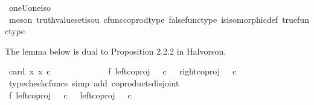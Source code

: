 \begin{isabellebody}
\isamarkupfalse%
%
\endisatagproof
{\isafoldproof}%
%
\isadelimproof
\isanewline
%
\endisadelimproof
\isanewline
{}\isamarkupfalse%
\ oneUone{\isacharunderscore}{\kern0pt}iso{\isacharunderscore}{\kern0pt}{\isasymOmega}{\isacharcolon}{\kern0pt}\isanewline
\ \ {\isachardoublequoteopen}{\isasymone}\ {\isasymCoprod}\ {\isasymone}\ {\isasymcong}\ {\isasymOmega}{\isachardoublequoteclose}\isanewline
%
\isadelimproof
\ \ %
\endisadelimproof
%
\isatagproof
{}\isamarkupfalse%
\ {\isacharparenleft}{\kern0pt}meson\ truth{\isacharunderscore}{\kern0pt}value{\isacharunderscore}{\kern0pt}set{\isacharunderscore}{\kern0pt}iso{\isacharunderscore}{\kern0pt}{}u{}\ cfunc{\isacharunderscore}{\kern0pt}coprod{\isacharunderscore}{\kern0pt}type\ false{\isacharunderscore}{\kern0pt}func{\isacharunderscore}{\kern0pt}type\ is{\isacharunderscore}{\kern0pt}isomorphic{\isacharunderscore}{\kern0pt}def\ true{\isacharunderscore}{\kern0pt}func{\isacharunderscore}{\kern0pt}type{\isacharparenright}{\kern0pt}%
\endisatagproof
{\isafoldproof}%
%
\isadelimproof
%
\endisadelimproof
%
\begin{isamarkuptext}%
The lemma below is dual to Proposition 2.2.2 in Halvorson.%
\end{isamarkuptext}\isamarkuptrue%
\isamarkupfalse%
\ {\isachardoublequoteopen}card\ {\isacharbraceleft}{\kern0pt}x{\isachardot}{\kern0pt}\ x\ {\isasymin}\isactrlsub c\ {\isasymOmega}\ {\isasymCoprod}\ {\isasymOmega}{\isacharbraceright}{\kern0pt}\ {\isacharequal}{\kern0pt}\ {}{\isachardoublequoteclose}\isanewline
%
\isadelimproof
%
\endisadelimproof
%
\isatagproof
{}\isamarkupfalse%
\ {\isacharminus}{\kern0pt}\isanewline
\ \ \isanewline
\ \ \isamarkupfalse%
\ f{}{\isacharcolon}{\kern0pt}\ {\isachardoublequoteopen}{\isacharparenleft}{\kern0pt}left{\isacharunderscore}{\kern0pt}coproj\ {\isasymOmega}\ {\isasymOmega}{\isacharparenright}{\kern0pt}\ {\isasymcirc}\isactrlsub c\ {\isasymt}\ {\isasymnoteq}\ {\isacharparenleft}{\kern0pt}right{\isacharunderscore}{\kern0pt}coproj\ {\isasymOmega}\ {\isasymOmega}{\isacharparenright}{\kern0pt}\ {\isasymcirc}\isactrlsub c\ {\isasymt}{\isachardoublequoteclose}\isanewline
\ \ \ \ \isamarkupfalse%
\ {\isacharparenleft}{\kern0pt}typecheck{\isacharunderscore}{\kern0pt}cfuncs{\isacharcomma}{\kern0pt}\ simp\ add{\isacharcolon}{\kern0pt}\ coproducts{\isacharunderscore}{\kern0pt}disjoint{\isacharparenright}{\kern0pt}\isanewline
\ \ \isamarkupfalse%
\ f{}{\isacharcolon}{\kern0pt}\ {\isachardoublequoteopen}{\isacharparenleft}{\kern0pt}left{\isacharunderscore}{\kern0pt}coproj\ {\isasymOmega}\ {\isasymOmega}{\isacharparenright}{\kern0pt}\ {\isasymcirc}\isactrlsub c\ {\isasymt}\ {\isasymnoteq}\ {\isacharparenleft}{\kern0pt}left{\isacharunderscore}{\kern0pt}coproj\ {\isasymOmega}\ {\isasymOmega}{\isacharparenright}{\kern0pt}\ {\isasymcirc}\isactrlsub c\ {\isasymf}{\isachardoublequoteclose}\isanewline

\end{isabellebody}

